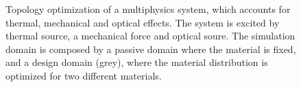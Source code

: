     \begin{figure}[tb]
        \centering
        \caption{Topology optimization of a multiphysics system, which accounts for thermal, mechanical and optical effects. The system is excited by thermal source, a mechanical force and optical soure. The simulation domain is composed by a passive domain where the material is fixed, and a design domain (grey), where the material distribution is optimized for two different materials.}
            \label{fig:top_opt_multi}
    \end{figure}
    
